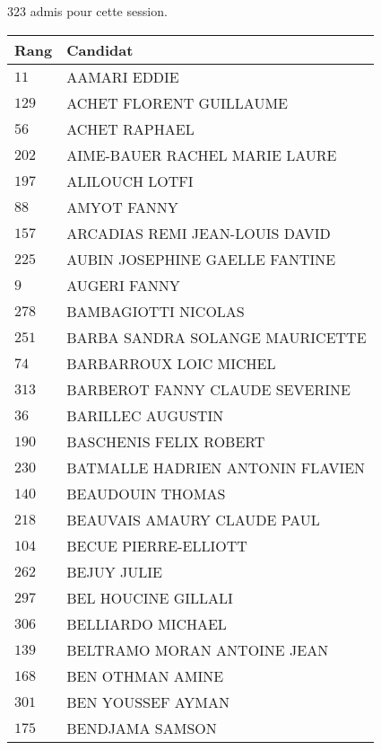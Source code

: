 



  $323$ admis pour cette session.

  \begin{xltabular}{\linewidth}{|l|X|}
    \hline
    \textbf{Rang} & \textbf{Candidat} \\
    \hline
    $11$ & AAMARI EDDIE \\
    \hline
    $129$ & ACHET FLORENT GUILLAUME \\
    \hline
    $56$ & ACHET RAPHAEL \\
    \hline
    $202$ & AIME-BAUER RACHEL MARIE LAURE \\
    \hline
    $197$ & ALILOUCH LOTFI \\
    \hline
    $88$ & AMYOT FANNY \\
    \hline
    $157$ & ARCADIAS REMI JEAN-LOUIS DAVID \\
    \hline
    $225$ & AUBIN JOSEPHINE GAELLE FANTINE \\
    \hline
    $9$ & AUGERI FANNY \\
    \hline
    $278$ & BAMBAGIOTTI NICOLAS \\
    \hline
    $251$ & BARBA SANDRA SOLANGE MAURICETTE \\
    \hline
    $74$ & BARBARROUX LOIC MICHEL \\
    \hline
    $313$ & BARBEROT FANNY CLAUDE SEVERINE \\
    \hline
    $36$ & BARILLEC AUGUSTIN \\
    \hline
    $190$ & BASCHENIS FELIX ROBERT \\
    \hline
    $230$ & BATMALLE HADRIEN ANTONIN FLAVIEN \\
    \hline
    $140$ & BEAUDOUIN THOMAS \\
    \hline
    $218$ & BEAUVAIS AMAURY CLAUDE PAUL \\
    \hline
    $104$ & BECUE PIERRE-ELLIOTT \\
    \hline
    $262$ & BEJUY JULIE \\
    \hline
    $297$ & BEL HOUCINE GILLALI \\
    \hline
    $306$ & BELLIARDO MICHAEL \\
    \hline
    $139$ & BELTRAMO MORAN ANTOINE JEAN \\
    \hline
    $168$ & BEN OTHMAN AMINE \\
    \hline
    $301$ & BEN YOUSSEF AYMAN \\
    \hline
    $175$ & BENDJAMA SAMSON \\

\end{xltabular}
